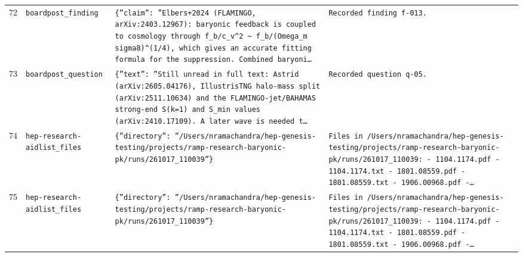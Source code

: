 \documentclass[11pt,a4paper]{article}
\begin{document}
\begin{longtable}{@{}p{}p{}p{}p{}@{}}
72 & \texttt{board}\newline\texttt{post\_\allowbreak{}finding} & \texttt{\{''claim'':\allowbreak{} ''Elbers+2024 (FLAMINGO,\allowbreak{} arXiv:\allowbreak{}2403.12967)\allowbreak{}:\allowbreak{} baryonic feedback is coupled to cosmology through f\_\allowbreak{}b/\allowbreak{}c\_\allowbreak{}v\textasciicircum{}\allowbreak{}2 \textasciitilde{}\allowbreak{} f\_\allowbreak{}b/\allowbreak{}(Omega\_\allowbreak{}m sigma8)\allowbreak{}\textasciicircum{}\allowbreak{}(1/\allowbreak{}4)\allowbreak{},\allowbreak{} which gives an accurate fitting formula for the suppression. Combined baryoni\ldots{}\allowbreak{}} & \texttt{Recorded finding f-013.} \\
73 & \texttt{board}\newline\texttt{post\_\allowbreak{}question} & \texttt{\{''text'':\allowbreak{} ''Still unread in full text:\allowbreak{} Astrid (arXiv:\allowbreak{}2605.04176)\allowbreak{},\allowbreak{} IllustrisTNG halo-mass split (arXiv:\allowbreak{}2511.10634)\allowbreak{} and the FLAMINGO-jet/\allowbreak{}BAHAMAS strong-end S(k=\allowbreak{}1)\allowbreak{} and S\_\allowbreak{}min values (arXiv:\allowbreak{}2410.17109)\allowbreak{}. A later wave is needed t\ldots{}\allowbreak{}} & \texttt{Recorded question q-05.} \\
74 & \texttt{hep-research-aid}\newline\texttt{list\_\allowbreak{}files} & \texttt{\{''directory'':\allowbreak{} ''/\allowbreak{}Users/\allowbreak{}nramachandra/\allowbreak{}hep-genesis-testing/\allowbreak{}projects/\allowbreak{}ramp-research-baryonic-pk/\allowbreak{}runs/\allowbreak{}261017\_\allowbreak{}110039''\}\allowbreak{}} & \texttt{Files in /\allowbreak{}Users/\allowbreak{}nramachandra/\allowbreak{}hep-genesis-testing/\allowbreak{}projects/\allowbreak{}ramp-research-baryonic-pk/\allowbreak{}runs/\allowbreak{}261017\_\allowbreak{}110039:\allowbreak{}   - 1104.1174.pdf   - 1104.1174.txt   - 1801.08559.pdf   - 1801.08559.txt   - 1906.00968.pdf   -\ldots{}\allowbreak{}} \\
75 & \texttt{hep-research-aid}\newline\texttt{list\_\allowbreak{}files} & \texttt{\{''directory'':\allowbreak{} ''/\allowbreak{}Users/\allowbreak{}nramachandra/\allowbreak{}hep-genesis-testing/\allowbreak{}projects/\allowbreak{}ramp-research-baryonic-pk/\allowbreak{}runs/\allowbreak{}261017\_\allowbreak{}110039''\}\allowbreak{}} & \texttt{Files in /\allowbreak{}Users/\allowbreak{}nramachandra/\allowbreak{}hep-genesis-testing/\allowbreak{}projects/\allowbreak{}ramp-research-baryonic-pk/\allowbreak{}runs/\allowbreak{}261017\_\allowbreak{}110039:\allowbreak{}   - 1104.1174.pdf   - 1104.1174.txt   - 1801.08559.pdf   - 1801.08559.txt   - 1906.00968.pdf   -\ldots{}\allowbreak{}} \\

\end{longtable}
\end{document}
